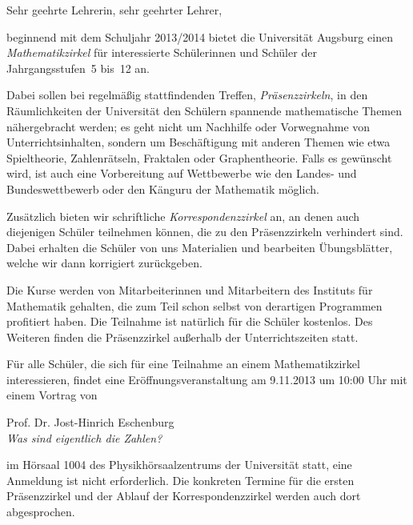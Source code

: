 \documentclass{zirkelbrief}
\begin{document}
\renewcommand{\anschrift}{%
      Holbein-Gymnasium Augsburg \\
      Fachbereich Mathematik \\
      Hallstraße 10 \\
      86150 Augsburg}
\renewcommand{\datum}{\today}
\renewcommand{\betreff}{Matheschülerzirkel der Universität Augsburg}


\makeletterhead

Sehr geehrte Lehrerin, sehr geehrter Lehrer,

beginnend mit dem Schuljahr 2013/2014 bietet die Universität Augsburg
einen \emph{Mathe\-matik\-zir\-kel} für interessierte Schülerinnen und Schüler der
Jahrgangsstufen~5 bis~12 an.

Dabei sollen bei regelmäßig stattfindenden Treffen, \emph{Präsenzzirkeln}, in
den Räumlichkeiten der Universität den Schülern spannende mathematische Themen
nähergebracht werden; es geht nicht um Nachhilfe oder Vorwegnahme von
Unterrichtsinhalten, sondern um Beschäftigung mit anderen Themen wie etwa
Spieltheorie, Zahlenrätseln, Fraktalen oder Graphentheorie. Falls es gewünscht
wird, ist auch eine Vorbereitung auf Wettbewerbe wie den Landes- und
Bundeswettbewerb oder den Känguru der Mathematik möglich.

Zusätzlich bieten wir schriftliche \emph{Korrespondenzzirkel} an, an denen auch diejenigen Schüler teilnehmen können, die zu den Präsenzzirkeln verhindert sind. Dabei erhalten die Schüler von uns
Materialien und bearbeiten Übungsblätter, welche wir dann korrigiert zurückgeben.

Die Kurse werden von Mitarbeiterinnen und Mitarbeitern des Instituts für
Mathematik gehalten, die zum Teil schon selbst von derartigen Programmen
profitiert haben. Die Teilnahme ist natürlich für die Schüler kostenlos. Des Weiteren finden die Präsenzzirkel
außerhalb der Unterrichtszeiten statt.

Für alle Schüler, die sich für eine Teilnahme an einem Mathematikzirkel
interessieren, findet eine Eröffnungsveranstaltung am 9.11.2013 um 10:00 Uhr mit einem Vortrag von
\linebreak
\vspace{-2.2em}
\begin{center}
    Prof. Dr. Jost-Hinrich Eschenburg\\
    \emph{Was sind eigentlich die Zahlen?}
\end{center}
\vspace{-1em}
im Hörsaal 1004 des Physikhörsaalzentrums der Universität statt, eine
Anmeldung ist nicht erforderlich. Die konkreten Termine für die
ersten Präsenzzirkel und der Ablauf der Korrespondenzzirkel werden auch dort
abgesprochen.
\end{document}
